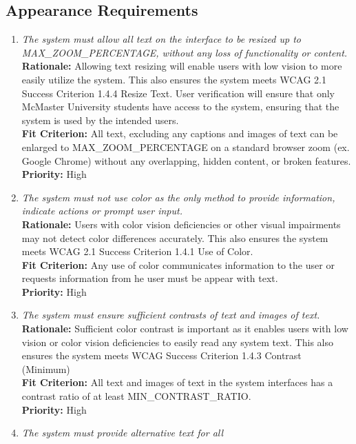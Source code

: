 \documentclass[12pt]{article}
\begin{document}
\subsection{Appearance Requirements}
\begin{enumerate}[label=LFR-AR \arabic*., wide=0pt, leftmargin=*]
  \item \emph{The system must allow all text on the interface to be resized up to MAX\_ZOOM\_PERCENTAGE, without any loss of functionality or content. }\\[2mm] 
    {\bf Rationale:} Allowing text resizing will enable users with low vision to more easily utilize the system. This also ensures the system meets WCAG 2.1 Success Criterion 1.4.4 Resize Text.
    User verification will ensure that only McMaster University students have access to the system, ensuring that the system is used by the intended users.  \\
    {\bf Fit Criterion:} All text, excluding any captions and images of text can be enlarged to MAX\_ZOOM\_PERCENTAGE on a standard browser zoom (ex. Google Chrome) without any overlapping, hidden content, or broken features.  \\
    {\bf Priority:} High
  \item \emph{The system must not use color as the only method to
    provide information, indicate actions or prompt user input.}\\[2mm]
    {\bf Rationale:} Users with color vision deficiencies or other
    visual impairments may not detect color differences accurately.
    This also ensures the system meets WCAG 2.1 Success Criterion
    1.4.1 Use of Color.\\
    {\bf Fit Criterion:} Any use of color communicates information to
    the user or requests information from he user must be appear with text.  \\
    {\bf Priority:} High
  \item \emph{The system must ensure sufficient contrasts of text and images of text.}\\[2mm] 
    {\bf Rationale:} Sufficient color contrast is important as it enables users with low vision or color vision deficiencies to easily read any system text. This also ensures the system meets WCAG Success Criterion 1.4.3 Contrast (Minimum)\\
    {\bf Fit Criterion:}  All text and images of text in the system interfaces has a contrast ratio of at least MIN\_CONTRAST\_RATIO.  \\
    {\bf Priority:} High
  \item \emph{The system must provide alternative text for all
}
\end{enumerate}
\end{document}
